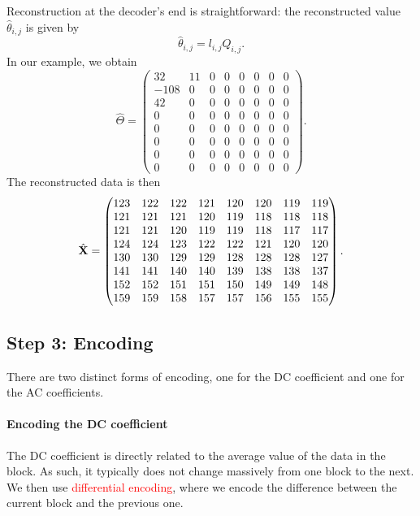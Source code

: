 \documentclass[a4paper, 11pt, openany]{book}
\numberwithin{equation}{section}
\theoremstyle{plain}
\theoremstyle{definition}
\newcommand{\Important}[1]{\textcolor{red}{#1}}
\begin{document}
Reconstruction at the decoder's end is straightforward: the reconstructed value $\hat{\theta}_{i,j}$ is given by 
\[
    \hat{\theta}_{i,j} = l_{i,j} Q_{i,j}.
\]
In our example, we obtain
\[
    \hat{\Theta} = \begin{pmatrix}
    32 & 11 & 0 & 0 & 0 & 0 & 0 & 0\\
    -108 & 0 & 0 & 0 & 0 & 0 & 0 & 0\\
    42 & 0 & 0 & 0 & 0 & 0 & 0 & 0\\
    0 & 0 & 0 & 0 & 0 & 0 & 0 & 0\\
    0 & 0 & 0 & 0 & 0 & 0 & 0 & 0\\
    0 & 0 & 0 & 0 & 0 & 0 & 0 & 0\\
    0 & 0 & 0 & 0 & 0 & 0 & 0 & 0\\
    0 & 0 & 0 & 0 & 0 & 0 & 0 & 0
    \end{pmatrix}.
\]
The reconstructed data is then
\[
    \hat{\bf X} = \begin{pmatrix}
    123 & 122 & 122 & 121 & 120 & 120 & 119 & 119\\
    121 & 121 & 121 & 120 & 119 & 118 & 118 & 118\\
    121 & 121 & 120 & 119 & 119 & 118 & 117 & 117\\
    124 & 124 & 123 & 122 & 122 & 121 & 120 & 120\\
    130 & 130 & 129 & 129 & 128 & 128 & 128 & 127\\
    141 & 141 & 140 & 140 & 139 & 138 & 138 & 137\\
    152 & 152 & 151 & 151 & 150 & 149 & 149 & 148\\
    159 & 159 & 158 & 157 & 157 & 156 & 155 & 155
    \end{pmatrix}.
\]

\subsection{Step 3: Encoding}

There are two distinct forms of encoding, one for the DC coefficient and one for the AC coefficients.

\paragraph{Encoding the DC coefficient} 
The DC coefficient is directly related to the average value of the data in the block. As such, it typically does not change massively from one block to the next. We then use \Important{differential encoding}, where we encode the difference between the current block and the previous one.
\end{document}
